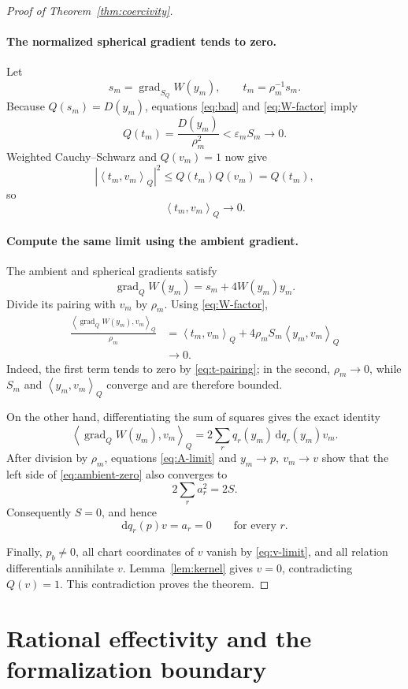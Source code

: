 \documentclass[11pt]{article}
\theoremstyle{definition}
\theoremstyle{remark}
\newcommand{\dd}{\mathrm d}
\newcommand{\grad}{\operatorname{grad}}
\newcommand{\inner}[2]{\left\langle #1,#2\right\rangle_Q}
\begin{document}
\begin{proof}[Proof of Theorem~\ref{thm:coercivity}]
\paragraph{The normalized spherical gradient tends to zero.}
Let
\[
  s_m=\grad_{S_Q}W(y_m),\qquad t_m=\rho_m^{-1}s_m.
\]
Because \(Q(s_m)=D(y_m)\), equations
\eqref{eq:bad} and \eqref{eq:W-factor} imply
\[
  Q(t_m)=\frac{D(y_m)}{\rho_m^2}
  <\varepsilon_m S_m\longrightarrow0.
  \tag{11}\label{eq:t-zero}
\]
Weighted Cauchy--Schwarz and \(Q(v_m)=1\) now give
\[
  |\inner{t_m}{v_m}|^2
  \leq Q(t_m)Q(v_m)=Q(t_m),
\]
so
\[
  \inner{t_m}{v_m}\longrightarrow0.
  \tag{12}\label{eq:t-pairing}
\]

\paragraph{Compute the same limit using the ambient gradient.}
The ambient and spherical gradients satisfy
\[
  \grad_QW(y_m)=s_m+4W(y_m)y_m.
\]
Divide its pairing with \(v_m\) by \(\rho_m\).  Using
\eqref{eq:W-factor},
\[
 \begin{aligned}
  \frac{\inner{\grad_QW(y_m)}{v_m}}{\rho_m}
   &=
     \inner{t_m}{v_m}
     +4\rho_m S_m\inner{y_m}{v_m}\\
   &\longrightarrow0.
 \end{aligned}
 \tag{13}\label{eq:ambient-zero}
\]
Indeed, the first term tends to zero by \eqref{eq:t-pairing}; in the
second, \(\rho_m\to0\), while \(S_m\) and
\(\inner{y_m}{v_m}\) converge and are therefore bounded.

On the other hand, differentiating the sum of squares gives the exact
identity
\[
  \inner{\grad_QW(y_m)}{v_m}
   =2\sum_r q_r(y_m)\,\dd q_r(y_m)v_m.
\]
After division by \(\rho_m\), equations \eqref{eq:A-limit} and
\(y_m\to p,\ v_m\to v\) show that the left side of
\eqref{eq:ambient-zero} also converges to
\[
  2\sum_r a_r^2=2S.
\]
Consequently \(S=0\), and hence
\[
  \dd q_r(p)v=a_r=0\qquad\text{for every }r.
\]

Finally, \(p_b\neq0\), all chart coordinates of \(v\) vanish by
\eqref{eq:v-limit}, and all relation differentials annihilate \(v\).
Lemma~\ref{lem:kernel} gives \(v=0\), contradicting \(Q(v)=1\).
This contradiction proves the theorem.
\end{proof}

\section{Rational effectivity and the formalization boundary}
\end{document}
